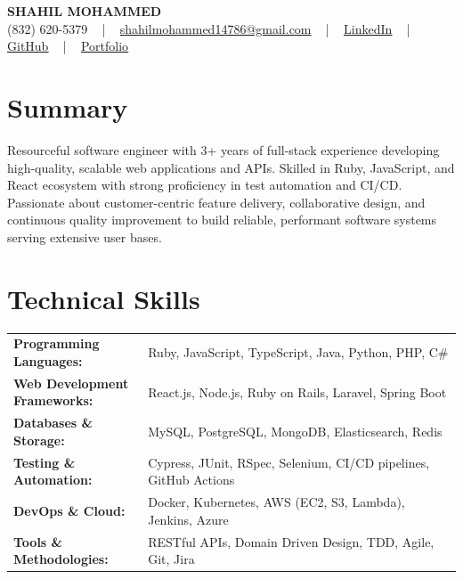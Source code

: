 \documentclass[letterpaper,11pt]{article}
\begin{document}
\begin{center}
    {\fontsize{14pt}{12pt}\selectfont \textbf{\MakeUppercase{Shahil Mohammed}}}\\ \vspace{2pt}
    \fontsize{10pt}{12pt}\selectfont (832) 620-5379 ~ | ~ \href{mailto:shahilmohammed14786@gmail.com}{shahilmohammed14786@gmail.com} ~ | ~  
    \href{https://www.linkedin.com/in/shahil-mohammed-9652931a1/}{\color{blue}\underline{LinkedIn}}  ~ | ~ 
    \href{https://github.com/freakbeast14}{\color{blue}\underline{GitHub}} ~ | ~ 
    \href{https://shahil-mohammed.netlify.app/}{\color{blue}\underline{Portfolio}}
    \vspace{-8pt}
\end{center}

\section{Summary}
\fontsize{9pt}{10pt}\selectfont
Resourceful software engineer with 3+ years of full-stack experience developing high-quality, scalable web applications and APIs. Skilled in Ruby, JavaScript, and React ecosystem with strong proficiency in test automation and CI/CD. Passionate about customer-centric feature delivery, collaborative design, and continuous quality improvement to build reliable, performant software systems serving extensive user bases.
 \vspace{-5pt}
 
\section{Technical Skills}
        \vspace{-14pt}
        \begin{table}[h]
            \fontsize{9pt}{10pt}\selectfont
            \begin{tabular}{p{0.3\linewidth} p{0.7\linewidth}}
                \textbf{Programming Languages:} & Ruby, JavaScript, TypeScript, Java, Python, PHP, C\# \\
                \textbf{Web Development Frameworks:} & React.js, Node.js, Ruby on Rails, Laravel, Spring Boot \\
                \textbf{Databases \& Storage:} & MySQL, PostgreSQL, MongoDB, Elasticsearch, Redis \\
                \textbf{Testing \& Automation:} & Cypress, JUnit, RSpec, Selenium, CI/CD pipelines, GitHub Actions \\
                \textbf{DevOps \& Cloud:} & Docker, Kubernetes, AWS (EC2, S3, Lambda), Jenkins, Azure \\
                \textbf{Tools \& Methodologies:} & RESTful APIs, Domain Driven Design, TDD, Agile, Git, Jira \\
            \end{tabular}
        \end{table}
 \vspace{-15pt}
 
\end{document}
